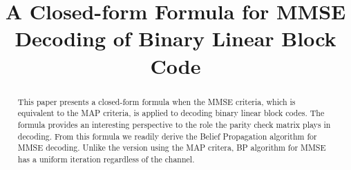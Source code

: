 \documentclass[conference]{IEEEtran}
\begin{document}
\title{A Closed-form Formula for MMSE Decoding of Binary Linear Block Code
%
}

\maketitle

\begin{abstract}
This paper presents a closed-form formula when the MMSE criteria, which is equivalent to the MAP criteria, is applied to decoding binary linear block codes. The formula provides an interesting perspective to the role the parity check matrix plays in decoding. From this formula we readily derive the Belief Propagation algorithm for MMSE decoding. Unlike the version using the MAP critera, BP algorithm for MMSE has a uniform iteration regardless of the channel.
\end{abstract}
\end{document}
